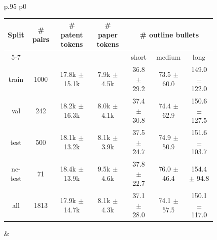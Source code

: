 \begin{figure}
  \small
  \setlength{\tabcolsep}{10pt}
  \begin{tabularx}{\textwidth}{p{} p{}}
    \centering
    \begin{tabular}[t]{ccccccc}
      \toprule
      \multirow{2}{*}{\textbf{Split}} & \multirow{2}{*}{\textbf{\# pairs}} & \multirow{2}{*}{\textbf{\# patent tokens}} & \multirow{2}{*}{\textbf{\# paper tokens}} & \multicolumn{3}{c}{\textbf{\# outline bullets}}                                       \\
      \cmidrule(lr){5-7}
                                      &                                    &                                            &                                           & short                                           & medium          & long              \\
      \midrule
      train                           & 1000                               & 17.8k $\pm$ 15.1k                      & 7.9k $\pm$ 4.5k                       & 36.8 $\pm$ 29.2                                 & 73.5 $\pm$ 60.0 & 149.0 $\pm$ 122.0 \\
      val                             & 242                                & 18.2k $\pm$ 16.3k                      & 8.0k $\pm$ 4.1k                       & 37.4 $\pm$ 30.8                                 & 74.4 $\pm$ 62.9 & 150.6 $\pm$ 127.5 \\
      test                            & 500                                & 18.1k $\pm$ 13.2k                      & 8.1k $\pm$ 3.9k                       & 37.5 $\pm$ 24.7                                 & 74.9 $\pm$ 50.9 & 151.6 $\pm$ 103.7 \\
      nc-test                         & 71                                 & 18.4k $\pm$ 13.9k                      & 9.5k $\pm$ 4.6k                       & 37.8 $\pm$ 22.7                                 & 76.0 $\pm$ 46.4 & 154.4 $\pm$ \phantom{0}94.8  \\
      \midrule
      all                             & 1813                               & 17.9k $\pm$ 14.7k                      & 8.1k $\pm$ 4.3k                       & 37.1 $\pm$ 28.0                                 & 74.1 $\pm$ 57.5 & 150.1 $\pm$ 117.0 \\
      \bottomrule
    \end{tabular}
    \label{tab:dataset_stats} &
  \end{tabularx}
\end{figure}



